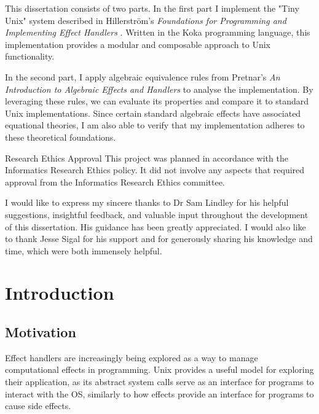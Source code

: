 \documentclass[logo,bsc,singlespacing,parskip]{infthesis}
\begin{document}
\begin{preliminary}
{This dissertation consists of two parts. In the first part I implement the "Tiny Unix" system described in Hillerström’s \textit{Foundations for Programming and Implementing Effect Handlers} \cite{hillerstrom_foundations_nodate}. Written in the Koka programming language, this implementation provides a modular and composable approach to Unix functionality. 

In the second part, I apply algebraic equivalence rules from Pretnar’s \textit{An Introduction to Algebraic Effects and Handlers} \cite{pretnar_introduction_2015} to analyse the implementation. By leveraging these rules, we can evaluate its properties and compare it to standard Unix implementations. Since certain standard algebraic effects have associated equational theories, I am also able to verify that my implementation adheres to these theoretical foundations.
}

\maketitle

\newenvironment{ethics}
   {\begin{frontenv}{Research Ethics Approval}{\LARGE}}
   {\end{frontenv}\newpage}

\begin{ethics}
This project was planned in accordance with the Informatics Research
Ethics policy. It did not involve any aspects that required approval
from the Informatics Research Ethics committee.

\standarddeclaration
\end{ethics}


\begin{acknowledgements}
I would like to express my sincere thanks to Dr Sam Lindley for his helpful suggestions, insightful feedback, and valuable input throughout the development of this dissertation. His guidance has been greatly appreciated. I would also like to thank Jesse Sigal for his support and for generously sharing his knowledge and time, which were both immensely helpful.
\end{acknowledgements}


\tableofcontents
\end{preliminary}


\chapter{Introduction}
\section{Motivation}
Effect handlers \cite{pretnar_introduction_2015} are increasingly being explored as a way to manage computational effects in programming. Unix provides a useful model for exploring their application, as its abstract system calls serve as an interface for programs to interact with the OS, similarly to how effects provide an interface for programs to cause side effects. 
\end{document}
